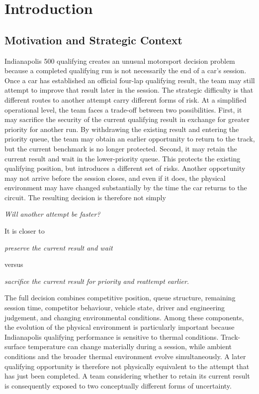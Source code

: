\section{Introduction}

\subsection{Motivation and Strategic Context}
Indianapolis 500 qualifying creates an unusual motorsport decision problem because a completed qualifying run is not necessarily the end of a car's session. Once a car has established an official four-lap qualifying result, the team may still attempt to improve that result later in the session. The strategic difficulty is that different routes to another attempt carry different forms of risk. At a simplified operational level, the team faces a trade-off between two possibilities. First, it may sacrifice the security of the current qualifying result in exchange for greater priority for another run. By withdrawing the existing result and entering the priority queue, the team may obtain an earlier opportunity to return to the track, but the current benchmark is no longer protected. Second, it may retain the current result and wait in the lower-priority queue. This protects the existing qualifying position, but introduces a different set of risks. Another opportunity may not arrive before the session closes, and even if it does, the physical environment may have changed substantially by the time the car returns to the circuit. The resulting decision is therefore not simply

\begin{center}\textit{Will another attempt be faster?}\end{center}

It is closer to

\begin{center}\textit{preserve the current result and wait}\end{center}

versus

\begin{center}\textit{sacrifice the current result for priority and reattempt earlier.}\end{center}

The full decision combines competitive position, queue structure, remaining session time, competitor behaviour, vehicle state, driver and engineering judgement, and changing environmental conditions. Among these components, the evolution of the physical environment is particularly important because Indianapolis qualifying performance is sensitive to thermal conditions. Track-surface temperature can change materially during a session, while ambient conditions and the broader thermal environment evolve simultaneously. A later qualifying opportunity is therefore not physically equivalent to the attempt that has just been completed. A team considering whether to retain its current result is consequently exposed to two conceptually different forms of uncertainty.

